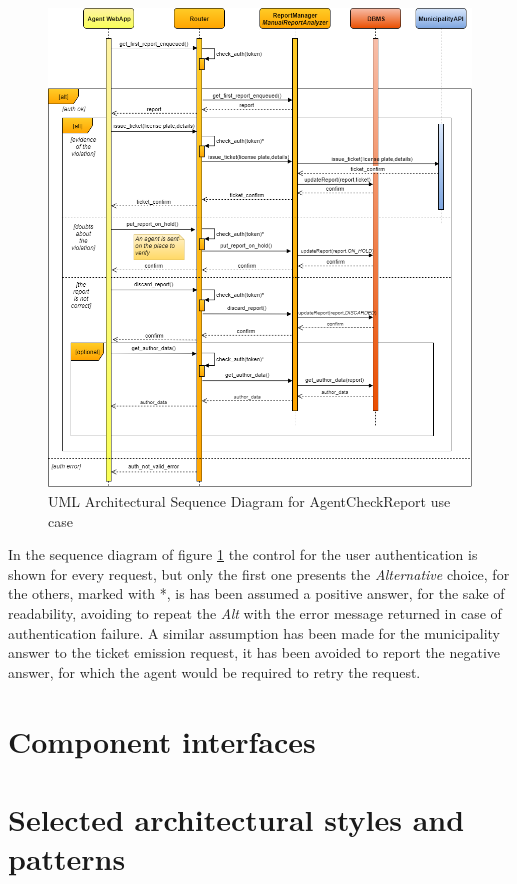 \documentclass[a4paper]{report}
\begin{document}
\begin{figure}[hp]
\includegraphics[width=\textwidth]{ArchSequenceAgentCheckReport}
\caption{UML Architectural Sequence Diagram for AgentCheckReport use case}
\label{fig:seq-checkReport}
\end{figure}
\restoregeometry
In the sequence diagram of figure \ref{fig:seq-checkReport} the control for the user authentication is shown for every request, but only the first one presents the \textit{Alternative} choice, for the others, marked with *, is has been assumed a positive answer, for the sake of readability, avoiding to repeat the \textit{Alt} with the error message returned in case of authentication failure. 
A similar assumption has been made for the municipality answer to the ticket emission request, it has been avoided to report the negative answer, for which the agent would be required to retry the request.

\section{Component interfaces}
\section{Selected architectural	styles and patterns}
\end{document}

